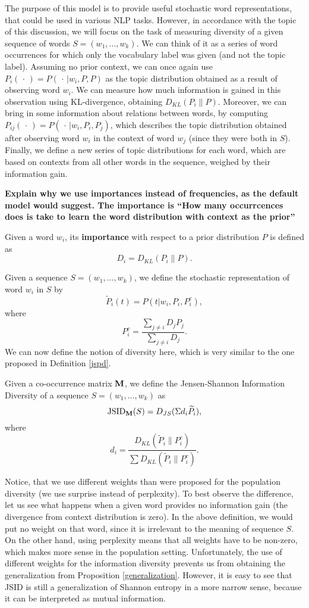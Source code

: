 The purpose of this model is to provide useful stochastic
word representations, that could be used in various NLP
tasks. However, in accordance with the topic of this discussion, we will
focus on the task of measuring diversity of a given sequence of words
$S=(w_1,...,w_k)$. We can think of it as a series of word occurrences for
which only the vocabulary label was given (and not the topic
label). Assuming no prior context, we can once again use
$P_i(\,\cdot\,)=P(\,\cdot\,|w_i,P,P)$  as the topic distribution
obtained as a result 
of observing word $w_i$. We can measure how much information is gained
in this observation using KL-divergence, obtaining
$D_{KL}(P_i\|P)$. Moreover, we can bring in some information about
relations between words, by computing $P_{ij}(\,\cdot\,) =
P(\,\cdot\,|w_i,P_i,P_j)$, 
which describes the topic distribution obtained after observing word
$w_i$ in the context of word $w_j$ (since they were both in
$S$). Finally, we define a new series of topic
distributions for each word, which are based on contexts from all other
words in the sequence, weighed by their information gain.

{\bf Explain why we use importances instead of frequencies, as the
  default model would suggest. The importance is ``How many
  occurrcences does is take to learn the word distribution with
  context as the prior''} 

\bed
Given a word $w_i$, its {\bf importance} with respect to a
prior distribution $P$ is defined as 
\[D_i = D_{KL}(P_i\|P).\]
\eed

\bed
Given a sequence $S=(w_1,...,w_k)$, we define the stochastic
representation of word $w_i$ in $S$ by 
\[\widetilde{P}_i(t) = P(t|w_i,P_i,P_i^c),\]
where
\[P_i^c = \frac{\sum_{j\neq i} D_jP_j}{\sum_{j\neq i}D_j}.\]
\eed
We can now define the notion of diversity here, which is very similar
to the one proposed in Definition \ref{jspd}.

\bed
Given a co-occurrence matrix $\operatorname{\mathbf{M}}$, we define the Jensen-Shannon
Information Diversity of a sequence 
$S=(w_1,...,w_k)$ as
\[\mbox{JSID}_{\operatorname{\mathbf{M}}}(S)=D_{JS}(\Sigma d_i \widetilde{P}_i),\]
where 
\[d_{i}=\frac{D_{KL}(\widetilde{P}_i\|P_i^c)}{\sum D_{KL}(\widetilde{P}_i\|P_i^c)}.\]
\eed

Notice, that we use different weights than were proposed for the
population diversity (we use surprise instead of perplexity). To
best observe the difference, let us see what happens when a given word
provides no information gain (the divergence from context distribution
is zero). In the above definition, we would put no weight on that
word, since it is irrelevant to the meaning of sequence $S$. On the
other hand, using perplexity means that all weights have to be
non-zero, which makes more sense in the population
setting. Unfortunately, the
use of different weights for the information diversity prevents us
from obtaining the generalization from Proposition
\ref{generalization}. However, it is easy to see that JSID is still a
generalization of Shannon entropy in a more narrow sense, because it
can be interpreted as mutual information. 

